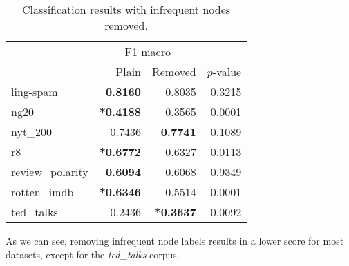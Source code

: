 \begin{table}[htb!]
    \centering
    \begin{tabular}{lrrr}
\toprule
        &  \multicolumn{2}{c}{F1 macro} &  \\
         &  Plain &  Removed &  $p$-value \\
        \midrule
           ling-spam       & \textbf{0.8160} & 0.8035 & 0.3215 \\
           ng20            & \textbf{*0.4188} & 0.3565 & 0.0001 \\
           nyt\_200         & 0.7436 & \textbf{0.7741} & 0.1089 \\
           r8              & \textbf{*0.6772} & 0.6327 & 0.0113 \\
           review\_polarity & \textbf{0.6094} & 0.6068 & 0.9349 \\
           rotten\_imdb     & \textbf{*0.6346} & 0.5514 & 0.0001 \\
           ted\_talks       & 0.2436 & \textbf{*0.3637} & 0.0092 \\
        \bottomrule
    \end{tabular}
    \caption[Results: Remove infrequent node labels]{Classification results with infrequent nodes removed.}\label{table:results_infrequent_nodes}
\end{table}

As we can see, removing infrequent node labels results in a lower score for most datasets, except for the \textit{ted\_talks} corpus.


